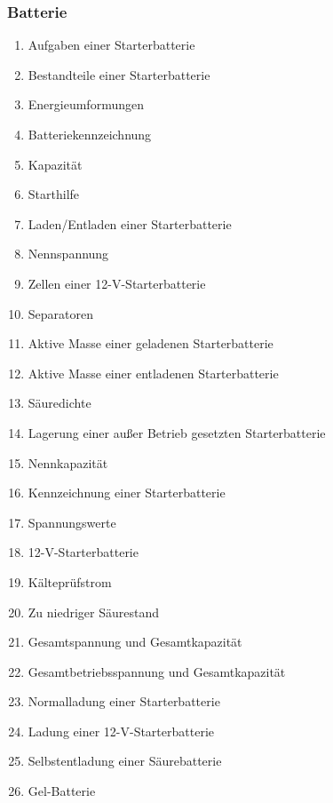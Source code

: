 \subsubsection{Batterie}\label{batterie}

\begin{enumerate}
\item
  Aufgaben einer Starterbatterie\\
\item
  Bestandteile einer Starterbatterie\\
\item
  Energieumformungen\\
\item
  Batteriekennzeichnung\\
\item
  Kapazität\\
\item
  Starthilfe\\
\item
  Laden/Entladen einer Starterbatterie\\
\item
  Nennspannung\\
\item
  Zellen einer 12-V-Starterbatterie\\
\item
  Separatoren\\
\item
  Aktive Masse einer geladenen Starterbatterie\\
\item
  Aktive Masse einer entladenen Starterbatterie\\
\item
  Säuredichte\\
\item
  Lagerung einer außer Betrieb gesetzten Starterbatterie\\
\item
  Nennkapazität\\
\item
  Kennzeichnung einer Starterbatterie\\
\item
  Spannungswerte\\
\item
  12-V-Starterbatterie\\
\item
  Kälteprüfstrom\\
\item
  Zu niedriger Säurestand\\
\item
  Gesamtspannung und Gesamtkapazität\\
\item
  Gesamtbetriebsspannung und Gesamtkapazität\\
\item
  Normalladung einer Starterbatterie\\
\item
  Ladung einer 12-V-Starterbatterie\\
\item
  Selbstentladung einer Säurebatterie\\
\item
  Gel-Batterie
\end{enumerate}

